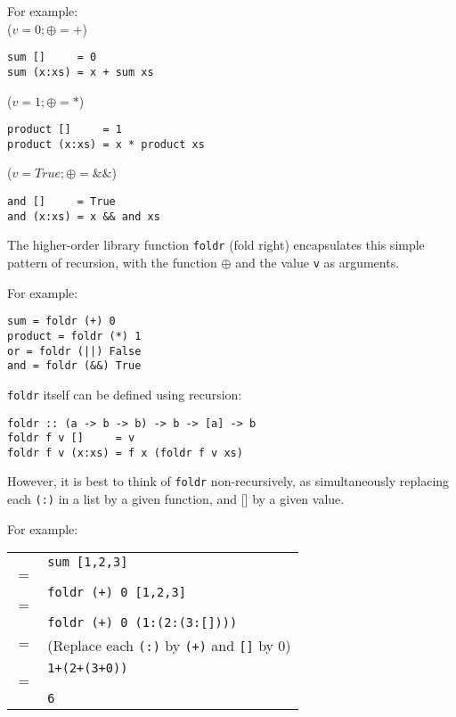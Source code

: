 \begin{multicols}{2}
For example:\\
(\(v = 0; \oplus = +\))
\begin{lstlisting}
sum []     = 0
sum (x:xs) = x + sum xs
\end{lstlisting}

(\(v = 1; \oplus = *\))
\begin{lstlisting}
product []     = 1
product (x:xs) = x * product xs
\end{lstlisting}

(\(v = True; \oplus = \&\&\))
\begin{lstlisting}
and []     = True
and (x:xs) = x && and xs
\end{lstlisting}

The higher-order library function \lstinline{foldr} (fold right) encapsulates this simple pattern of recursion, with the function \(\oplus\) and the value \lstinline{v} as arguments.

For example:
\begin{lstlisting}
sum = foldr (+) 0
product = foldr (*) 1
or = foldr (||) False
and = foldr (&&) True
\end{lstlisting}

\lstinline{foldr} itself can be defined using recursion:
\begin{lstlisting}
foldr :: (a -> b -> b) -> b -> [a] -> b
foldr f v []     = v
foldr f v (x:xs) = f x (foldr f v xs)
\end{lstlisting}

However, it is best to think of \lstinline{foldr} non-recursively, as simultaneously replacing each \lstinline{(:)} in a list by a given function, and [] by a given value.

For example:\\
\begin{tabularx}{\linewidth}{lX}
  & \lstinline{sum [1,2,3]}\\
  \(=\) & \\
  & \lstinline{foldr (+) 0 [1,2,3]}\\
  \(=\) & \\
  & \lstinline{foldr (+) 0 (1:(2:(3:[])))}\\
  \(=\) & \tiny{(Replace each \lstinline{(:)} by \lstinline{(+)} and \lstinline{[]} by 0)} \\
  & \lstinline{1+(2+(3+0))}\\
  \(=\) & \\
  & \lstinline{6}\\
\end{tabularx}


\end{multicols}
